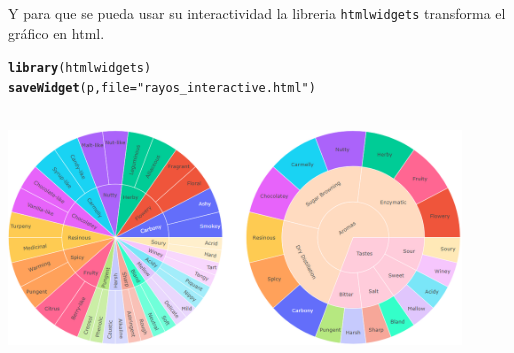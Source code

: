 \documentclass{article}\usepackage[]{graphicx}\usepackage[]{color}
\makeatletter
\newcommand{\hlstr}[1]{\textcolor[rgb]{0.192,0.494,0.8}{#1}}%
\newcommand{\hlstd}[1]{\textcolor[rgb]{0.345,0.345,0.345}{#1}}%
\newcommand{\hlkwc}[1]{\textcolor[rgb]{0.333,0.667,0.333}{#1}}%
\newcommand{\hlkwd}[1]{\textcolor[rgb]{0.737,0.353,0.396}{\textbf{#1}}}%
\newenvironment{kframe}{%
 \def\at@end@of@kframe{}%
 \ifinner\ifhmode%
  \def\at@end@of@kframe{\end{minipage}}%
  \begin{minipage}{\columnwidth}%
 \fi\fi%
 \def\FrameCommand##1{\hskip\@totalleftmargin \hskip-\fboxsep
 \colorbox{shadecolor}{##1}\hskip-\fboxsep
     \hskip-\linewidth \hskip-\@totalleftmargin \hskip\columnwidth}%
 \MakeFramed {\advance\hsize-\width
   \@totalleftmargin\z@ \linewidth\hsize
   \@setminipage}}%
 {\par\unskip\endMakeFramed%
 \at@end@of@kframe}
\newenvironment{knitrout}{}{} %
\makeatother
\begin{document}
Y para que se pueda usar su interactividad la libreria \texttt{htmlwidgets} transforma el gr\'afico en html.
\begin{knitrout}
\color{fgcolor}\begin{kframe}
\begin{alltt}
\hlkwd{library}\hlstd{(htmlwidgets)}
\hlkwd{saveWidget}\hlstd{(p,} \hlkwc{file} \hlstd{=} \hlstr{"rayos_interactive.html"}\hlstd{)}
\end{alltt}
\end{kframe}
\end{knitrout}
~\\
\vbox{
    \centering
    \includegraphics[width=0.9\textwidth]{imag/rayos_interactive}
}
\clearpage
\end{document}
